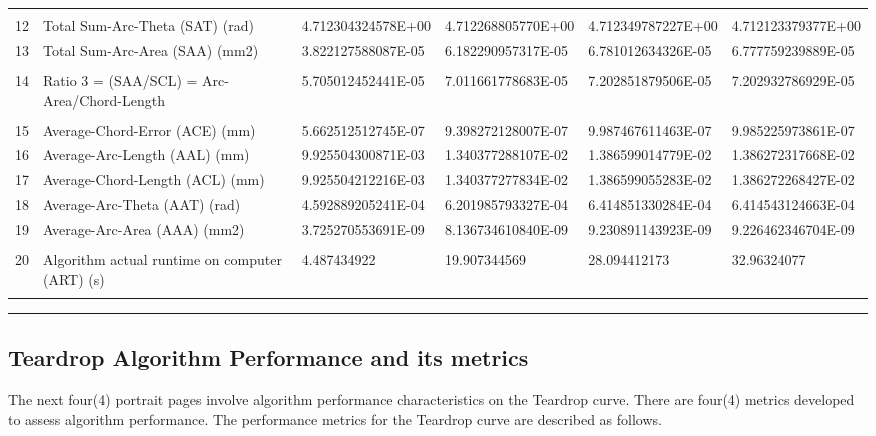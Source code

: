 \begin{landscape}
\begin{table}[ht]
{\begin{tabular}{ p{0.2cm} p{8.80cm} p{4.00cm} p{4.0cm} p{4.00cm} p{4.0cm}}
&		&		&		&		&		\\
12	&	Total Sum-Arc-Theta (SAT) (rad)	&	4.712304324578E+00	&	4.712268805770E+00	&	4.712349787227E+00	&	4.712123379377E+00	\\
13	&	Total Sum-Arc-Area (SAA) (mm2)	&	3.822127588087E-05	&	6.182290957317E-05	&	6.781012634326E-05	&	6.777759239889E-05	\\
&		&		&		&		&		\\
14	&	Ratio 3 = (SAA/SCL) = Arc-Area/Chord-Length	&	5.705012452441E-05	&	7.011661778683E-05	&	7.202851879506E-05	&	7.202932786929E-05	\\
&		&		&		&		&		\\
15	&	Average-Chord-Error (ACE) (mm)	&	5.662512512745E-07	&	9.398272128007E-07	&	9.987467611463E-07	&	9.985225973861E-07	\\
16	&	Average-Arc-Length (AAL) (mm)	&	9.925504300871E-03	&	1.340377288107E-02	&	1.386599014779E-02	&	1.386272317668E-02	\\
17	&	Average-Chord-Length (ACL) (mm)	&	9.925504212216E-03	&	1.340377277834E-02	&	1.386599055283E-02	&	1.386272268427E-02	\\
18	&	Average-Arc-Theta (AAT) (rad)	&	4.592889205241E-04	&	6.201985793327E-04	&	6.414851330284E-04	&	6.414543124663E-04	\\
19	&	Average-Arc-Area (AAA) (mm2)	&	3.725270553691E-09	&	8.136734610840E-09	&	9.230891143923E-09	&	9.226462346704E-09	\\
&		&		&		&		&		\\
20	&	Algorithm actual runtime on computer (ART) (s) 	&	4.487434922	&	19.907344569	&	28.094412173	&	32.96324077	\\
&		&		&		&		&		


\end{tabular}
			
			
}   %
\hrule
\end{table}
\end{landscape}

\clearpage
\pagebreak

\subsection{Teardrop Algorithm Performance and its metrics}
\label{ssec-chap4-Teardrop-Algorithm Performance}

The next four(4) portrait pages involve algorithm performance characteristics on the Teardrop curve. There are four(4) metrics developed to assess algorithm performance. The performance metrics for the Teardrop curve are described as follows.\\

